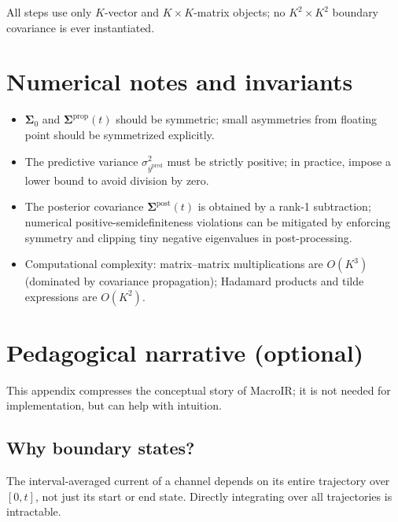 \documentclass[11pt]{article}
\begin{document}
All steps use only \(K\)-vector and \(K\times K\)-matrix objects; no \(K^2\times K^2\) boundary covariance is ever instantiated.

\section{Numerical notes and invariants}

\begin{itemize}
  \item \(\boldsymbol{\Sigma}_0\) and \(\boldsymbol{\Sigma}^{\text{prop}}(t)\) should be symmetric; small asymmetries from floating point should be symmetrized explicitly.
  \item The predictive variance \(\sigma^2_{\overline{y}^{\text{pred}}}\) must be strictly positive; in practice, impose a lower bound to avoid division by zero.
  \item The posterior covariance \(\boldsymbol{\Sigma}^{\text{post}}(t)\) is obtained by a rank-1 subtraction; numerical positive-semidefiniteness violations can be mitigated by enforcing symmetry and clipping tiny negative eigenvalues in post-processing.
  \item Computational complexity: matrix--matrix multiplications are \(O(K^3)\) (dominated by covariance propagation); Hadamard products and tilde expressions are \(O(K^2)\).
\end{itemize}

\appendix

\section{Pedagogical narrative (optional)}

This appendix compresses the conceptual story of MacroIR; it is not needed for implementation, but can help with intuition.

\subsection{Why boundary states?}

The interval-averaged current of a channel depends on its entire trajectory over \([0,t]\), not just its start or end state. Directly integrating over all trajectories is intractable.
\end{document}
